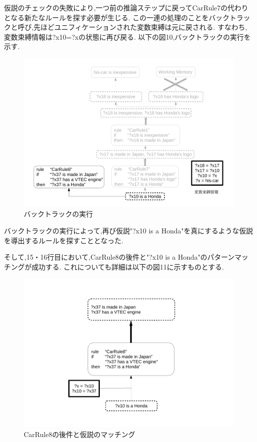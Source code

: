 \documentclass[uplatex,12pt]{jsarticle}
\begin{document}
仮説のチェックの失敗により,一つ前の推論ステップに戻ってCarRule7の代わりとなる新たなルールを探す必要が生じる.
この一連の処理のことをバックトラックと呼び,先ほどユニフィケーションされた変数束縛は元に戻される.
すなわち,変数束縛情報は?x10=?xの状態に再び戻る.
以下の図10,バックトラックの実行を示す.
\begin{figure}[!hbt]
    \centering
    \includegraphics[scale=0.40]{images/backward_chaining_6.pdf}
    \caption{バックトラックの実行}
\end{figure}
バックトラックの実行によって,再び仮説"?x10 is a Honda"を真にするような仮説を導出するルールを探すこととなった. \\

\newpage

そして,15・16行目において,CarRule8の後件と"?x10 is a Honda"のパターンマッチングが成功する.
これについても詳細は以下の図11に示すものとする.
\begin{figure}[!hbt]
    \centering
    \includegraphics[scale=0.30]{images/backward_chaining_7.pdf}
    \caption{CarRule8の後件と仮説のマッチング}
\end{figure}
\end{document}
